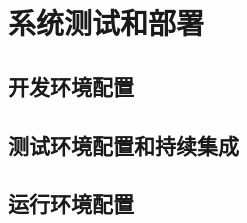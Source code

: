 
\chapter{系统测试和部署}
\label{chap:test_and_deploy}

\section{开发环境配置}
\section{测试环境配置和持续集成}
\section{运行环境配置}
